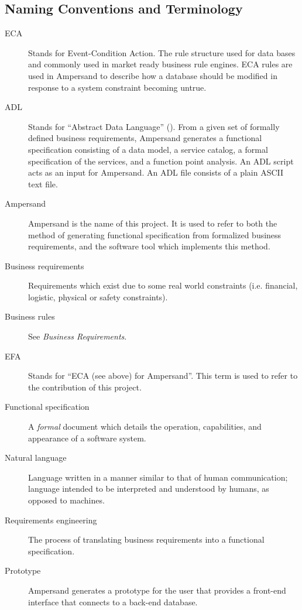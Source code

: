 \documentclass[journal,12pt,onecolumn,draftclsnofoot]{article}
\let\Oldsubsection\subsection
\renewcommand{\subsection}{\FloatBarrier\Oldsubsection}
\begin{document}
\subsection{Naming Conventions and Terminology}\label{sec:Naming} 
\begin{description}
    \item[ECA] Stands for Event-Condition Action. The rule structure used for 
    data
    bases and commonly used in market ready business rule engines. ECA rules are
    used in Ampersand to describe how a database should be modified in response 
    to
    a system constraint becoming untrue. 
    
    \item [ADL] Stands for ``Abstract Data Language'' (\cite[13]{derFun}). From 
    a
    given set of formally defined business requirements, Ampersand generates a
    functional specification consisting of a data model, a service catalog, a
    formal specification of the services, and a function point analysis. An ADL
    script acts as an input for Ampersand. An ADL file consists of a plain ASCII
    text file.
    
    \item [Ampersand] Ampersand is the name of this project. It is used to 
    refer to
    both the method of generating functional specification from formalized
    business requirements, and the software tool which implements this method.
    
    \item [Business requirements] Requirements which exist due to some real 
    world 
    constraints (i.e. financial, logistic, physical or safety constraints). 
    
    \item [Business rules] See \emph{Business Requirements}.
    
    \item [EFA] Stands for ``ECA (see above) for Ampersand''. This term is used 
    to 
    refer to the contribution of this project. 
    
    \item [Functional specification] A \emph{formal} document which details the 
    operation,
    capabilities, and appearance of a software system. 
    
    \item [Natural language] Language written in a manner similar to that of 
    human 
    communication; language intended to be interpreted and understood by 
    humans, as 
    opposed to machines. 
    
    \item [Requirements engineering] The process of translating business
    requirements into a functional specification. 
    
    \item [Prototype] Ampersand generates a prototype for the user that 
    provides a 
    front-end interface that connects to a back-end database.
    
\end{description}
\end{document}
